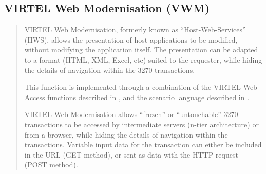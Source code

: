 \documentclass[letterpaper,10pt,english]{sphinxmanual}
\begin{document}
\subsection{VIRTEL Web Modernisation (VWM)}
\label{\detokenize{User_Guide:virtel-web-modernisation-vwm}}\begin{quote}

VIRTEL Web Modernisation, formerly known as “Host-Web-Services”
(HWS), allows the presentation of host applications to be modified,
without modifying the application itself. The presentation can be
adapted to a format (HTML, XML, Excel, etc) suited to the requester,
while hiding the details of navigation within the 3270 transactions.

This function is implemented through a combination of the VIRTEL Web Access functions described in {\hyperref[\detokenize{User_Guide:v457ug-creating-html}]{}}, and the scenario language described in {\hyperref[\detokenize{User_Guide:v457ug-virtel-scenarios}]{}}.

VIRTEL Web Modernisation allows “frozen” or “untouchable” 3270
transactions to be accessed by intermediate servers (n-tier
architecture) or from a browser, while hiding the details of
navigation within the transactions. Variable input data for the
transaction can either be included in the URL (GET method), or sent
as data with the HTTP request (POST method).
\end{quote}
\end{document}
